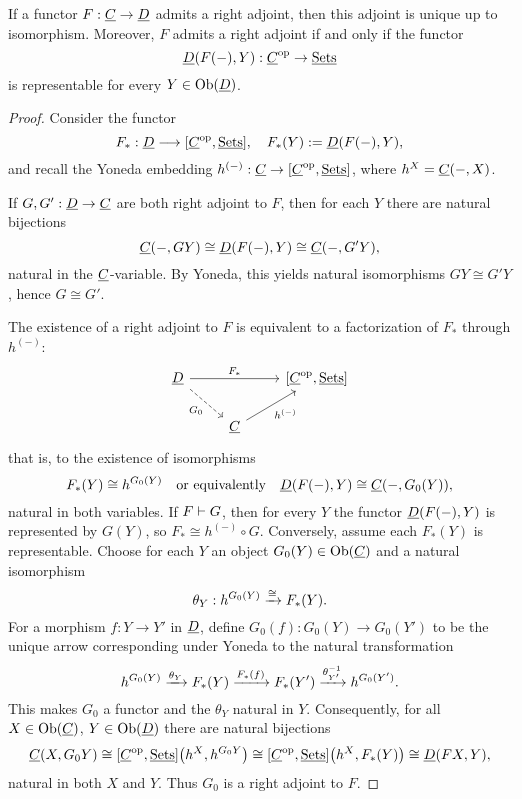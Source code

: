 \begin{proposition*}
	If a functor \( F: \underline{C} \to \underline{D} \) admits a right adjoint, then this adjoint is unique up to isomorphism. Moreover, \( F \) admits a right adjoint if and only if the functor
	\[
		\underline{D}(F(-), Y): \underline{C}^\mathrm{op} \to \underline{\mathrm{Sets}}
	\]
	is representable for every \( Y \in \operatorname{Ob}(\underline{D}) \).
\end{proposition*}

\begin{proof}
	Consider the functor
	\[
		F_*: \underline{D} \longrightarrow [\underline{C}^\mathrm{op}, \underline{\mathrm{Sets}}],
		\quad 
		F_*(Y) := \underline{D}(F(-), Y),
	\]
	and recall the Yoneda embedding \( h^{(-)}: \underline{C} \to [\underline{C}^\mathrm{op}, \underline{\mathrm{Sets}}] \), where \( h^{X} = \underline{C}(-, X) \).


	If \( G, G': \underline{D} \to \underline{C} \) are both right adjoint to \( F \), then for each \( Y \) there are natural bijections
	\[
		\underline{C}(-, GY) \cong \underline{D}(F(-), Y) \cong \underline{C}(-, G'Y),
	\]
	natural in the \( \underline{C} \)-variable. By Yoneda, this yields natural isomorphisms \( GY \cong G'Y \), hence \( G \cong G' \).


	The existence of a right adjoint to \( F \) is equivalent to a factorization of \( F_* \) through \( h^{(-)} \):
	\[
		\begin{tikzcd}
			\D \arrow[rr, "F_*"] \arrow[dr, dashed, "G_0"'] && {[\C^\op, \ctSet]} \\
			& \C \arrow[ur, "h^{(-)}"'] &
		\end{tikzcd}
	\]
	that is, to the existence of isomorphisms
	\[
		F_*(Y) \cong h^{G_0(Y)} \quad \text{or equivalently} \quad
		\underline{D}(F(-), Y) \cong \underline{C}(-, G_0(Y)),
	\]
	natural in both variables. If \( F \mathrel{\vdash} G \), then for every \( Y \) the functor \( \underline{D}(F(-), Y) \) is represented by \( G(Y) \), so \( F_* \cong h^{(-)} \circ G \). Conversely, assume each \( F_*(Y) \) is representable. Choose for each \( Y \) an object \( G_0(Y) \in \operatorname{Ob}(\underline{C}) \) and a natural isomorphism
	\[
		\theta_Y: h^{G_0(Y)} \xrightarrow{ \cong} F_*(Y).
	\]
	For a morphism \( f: Y \to Y' \) in \( \underline{D} \), define \( G_0(f): G_0(Y) \to G_0(Y') \) to be the unique arrow corresponding under Yoneda to the natural transformation
	\[
		h^{G_0(Y)} \xrightarrow{\theta_Y} F_*(Y) \xrightarrow{F_*(f)} F_*(Y') \xrightarrow{\theta_{Y'}^{-1}} h^{G_0(Y')}.
	\]
	This makes \( G_0 \) a functor and the \( \theta_Y \) natural in \( Y \). Consequently, for all \( X \in \operatorname{Ob}(\underline{C}) \), \( Y \in \operatorname{Ob}(\underline{D}) \) there are natural bijections
	\[
		\underline{C}(X, G_0Y)
		\cong [\underline{C}^\mathrm{op}, \underline{\mathrm{Sets}}]\bigl(h^{X}, h^{G_0Y}\bigr)
		\cong [\underline{C}^\mathrm{op}, \underline{\mathrm{Sets}}]\bigl(h^{X}, F_*(Y)\bigr)
		\cong \underline{D}(FX, Y),
	\]
	natural in both \( X \) and \( Y \). Thus \( G_0 \) is a right adjoint to \( F \).
\end{proof}

